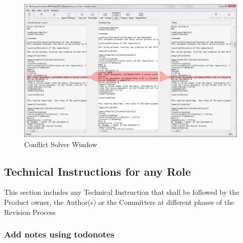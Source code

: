 \documentclass{template/openetcs_article}
\begin{document}
\begin{figure}[H]
\centering
\includegraphics[width=\textwidth]{./figures/ConflictSolverWindow.JPG}
\caption{Conflict Solver Window}
\end{figure}

\subsection{Technical Instructions for any Role}
This section includes any Technical Instruction that shall be followed by the Product owner, the Author(s) or the Committers at different phases of the Revision Process

\subsubsection{Add notes using todonotes}
\end{document}
